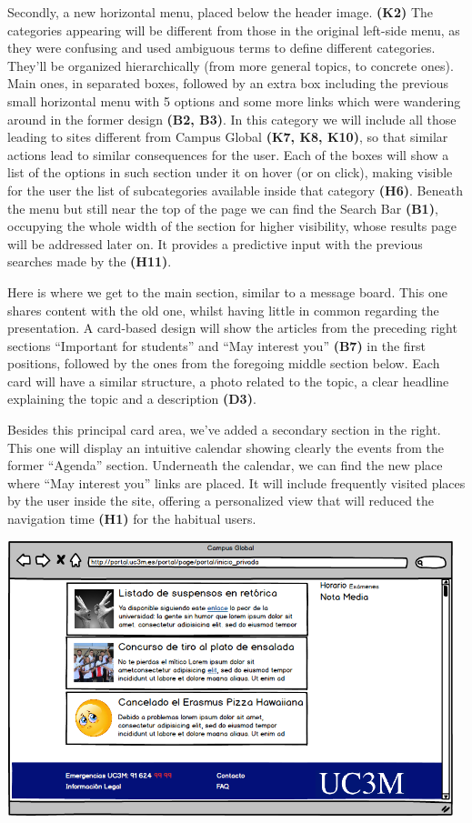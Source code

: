 \documentclass{article}
\begin{document}
Secondly, a new horizontal menu, placed below the header image. \textbf{(K2)} The categories appearing will be different from those in the original left-side menu, as they were confusing and used ambiguous terms to define different categories. They’ll be organized hierarchically (from more general topics, to concrete ones). Main ones, in separated boxes, followed by an extra box including the previous small horizontal menu with 5 options and some more links which were wandering around in the former design \textbf{(B2, B3)}. In this category we will include all those leading to sites different from Campus Global \textbf{(K7, K8, K10)}, so that similar actions lead to similar consequences for the user. Each of the boxes will show a list of the options in such section under it on hover (or on click), making visible for the user the list of subcategories available inside that category \textbf{(H6)}. Beneath the menu but still near the top of the page we can find the Search Bar \textbf{(B1)}, occupying the whole width of the section for higher visibility, whose results page will be addressed later on. It provides a predictive input with the previous searches made by the \textbf{(H11)}.

Here is where we get to the main section, similar to a message board. This one shares content with the old one, whilst having little in common regarding the presentation. A card-based design will show the articles from the preceding right sections “Important for students” and “May interest you” \textbf{(B7)}  in the first positions, followed by the ones from the foregoing middle section below. Each card will have a similar structure, a photo related to the topic, a clear headline explaining the topic and a description \textbf{(D3)}.

Besides this principal card area, we’ve added a secondary section in the right. This one will display an intuitive calendar showing clearly the events from the former “Agenda” section. Underneath the calendar, we can find the new place where “May interest you” links are placed. It will include frequently visited places by the user inside the site, offering a personalized view that will reduced the navigation time \textbf{(H1)} for the habitual users.

\begin{center}
\includegraphics[width=13cm, height=8cm, keepaspectratio]{mockup_homepage_footer}
\end{center}
\end{document}
